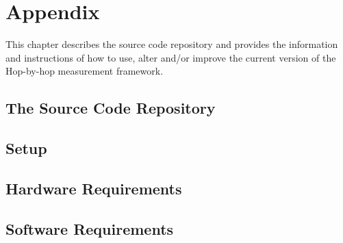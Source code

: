 \chapter{Appendix}
This chapter describes the source code repository and provides the information and  instructions of how to use, alter and/or improve the current version of the Hop-by-hop measurement framework. 

\section{The Source Code Repository}

\section{Setup}

\section{Hardware Requirements}

\section{Software Requirements}


